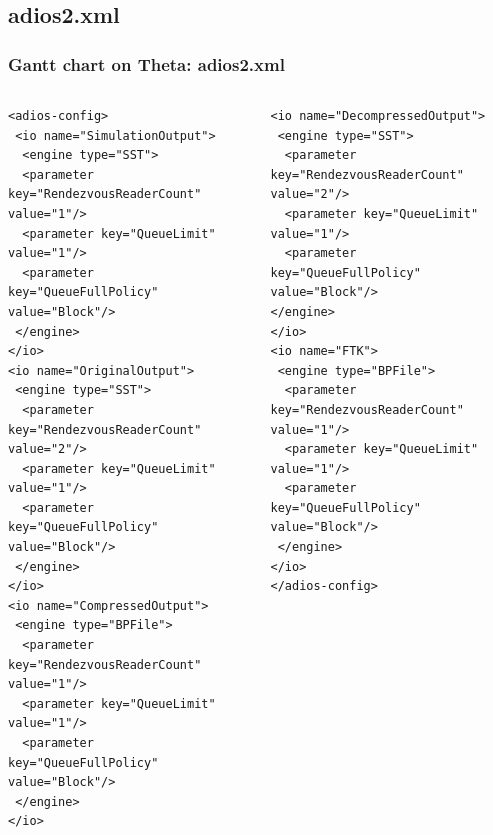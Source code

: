 \subsection{adios2.xml}
\begin{frame}[fragile]
  \frametitle{Gantt chart on Theta: adios2.xml}

  \begin{columns}

    \begin{column}{0.5\textwidth}
{\tiny
\begin{verbatim}
<adios-config>
 <io name="SimulationOutput">
  <engine type="SST">
  <parameter key="RendezvousReaderCount" value="1"/>
  <parameter key="QueueLimit" value="1"/>
  <parameter key="QueueFullPolicy" value="Block"/>
 </engine>
</io>
<io name="OriginalOutput">
 <engine type="SST">
  <parameter key="RendezvousReaderCount" value="2"/>
  <parameter key="QueueLimit" value="1"/>
  <parameter key="QueueFullPolicy" value="Block"/>
 </engine>
</io>
<io name="CompressedOutput">
 <engine type="BPFile">
  <parameter key="RendezvousReaderCount" value="1"/>
  <parameter key="QueueLimit" value="1"/>
  <parameter key="QueueFullPolicy" value="Block"/>
 </engine>
</io>
\end{verbatim}
}

    \end{column}

    \begin{column}{0.5\textwidth}

{\tiny
\begin{verbatim}
<io name="DecompressedOutput">
 <engine type="SST">
  <parameter key="RendezvousReaderCount" value="2"/>
  <parameter key="QueueLimit" value="1"/>
  <parameter key="QueueFullPolicy" value="Block"/>
</engine>
</io>
<io name="FTK">
 <engine type="BPFile">
  <parameter key="RendezvousReaderCount" value="1"/>
  <parameter key="QueueLimit" value="1"/>
  <parameter key="QueueFullPolicy" value="Block"/>
 </engine>
</io>
</adios-config>
\end{verbatim}
}
      
    \end{column}
  \end{columns}


\end{frame}




